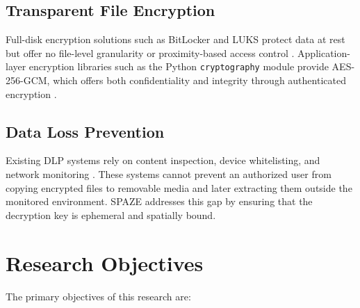 \documentclass[conference]{IEEEtran}
\begin{document}
\subsection{Transparent File Encryption}
Full-disk encryption solutions such as BitLocker and LUKS protect data at rest but offer no file-level granularity or proximity-based access control \cite{fde_survey}. Application-layer encryption libraries such as the Python \texttt{cryptography} module provide AES-256-GCM, which offers both confidentiality and integrity through authenticated encryption \cite{aes_gcm_nist}.

\subsection{Data Loss Prevention}
Existing DLP systems rely on content inspection, device whitelisting, and network monitoring \cite{dlp_survey}. These systems cannot prevent an authorized user from copying encrypted files to removable media and later extracting them outside the monitored environment. SPAZE addresses this gap by ensuring that the decryption key is ephemeral and spatially bound.

\section{Research Objectives}

The primary objectives of this research are:
\end{document}
